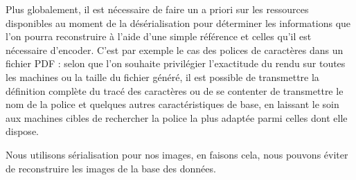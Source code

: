 Plus globalement, il est nécessaire de faire un a priori sur les ressources disponibles au moment de la désérialisation pour déterminer les informations que l'on pourra reconstruire à l'aide d'une simple référence et celles qu'il est nécessaire d'encoder. C'est par exemple le cas des polices de caractères dans un fichier PDF : selon que l'on souhaite privilégier l'exactitude du rendu sur toutes les machines ou la taille du fichier généré, il est possible de transmettre la définition complète du tracé des caractères ou de se contenter de transmettre le nom de la police et quelques autres caractéristiques de base, en laissant le soin aux machines cibles de rechercher la police la plus adaptée parmi celles dont elle dispose.

Nous utilisons sérialisation pour nos images, en faisons cela, nous pouvons éviter de reconstruire les images de la base des données.




